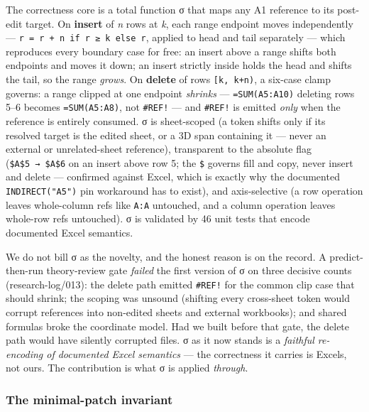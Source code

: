 \documentclass[
]{article}
\begin{document}
The correctness core is a total function σ that maps any A1 reference to
its post-edit target. On \textbf{insert} of \emph{n} rows at \emph{k},
each range endpoint moves independently ---
\texttt{r\textquotesingle{}\ =\ r\ +\ n\ if\ r\ ≥\ k\ else\ r}, applied
to head and tail separately --- which reproduces every boundary case for
free: an insert above a range shifts both endpoints and moves it down;
an insert strictly inside holds the head and shifts the tail, so the
range \emph{grows}. On \textbf{delete} of rows \texttt{{[}k,\ k+n)}, a
six-case clamp governs: a range clipped at one endpoint \emph{shrinks}
--- \texttt{=SUM(A5:A10)} deleting rows 5--6 becomes
\texttt{=SUM(A5:A8)}, not \texttt{\#REF!} --- and \texttt{\#REF!} is
emitted \emph{only} when the reference is entirely consumed. σ is
sheet-scoped (a token shifts only if its resolved target is the edited
sheet, or a 3D span containing it --- never an external or
unrelated-sheet reference), transparent to the absolute flag
(\texttt{\$A\$5\ →\ \$A\$6} on an insert above row 5; the \texttt{\$}
governs fill and copy, never insert and delete --- confirmed against
Excel, which is exactly why the documented \texttt{INDIRECT("A5")} pin
workaround has to exist), and axis-selective (a row operation leaves
whole-column refs like \texttt{A:A} untouched, and a column operation
leaves whole-row refs untouched). σ is validated by 46 unit tests that
encode documented Excel semantics.

We do not bill σ as the novelty, and the honest reason is on the record.
A predict-then-run theory-review gate \emph{failed} the first version of
σ on three decisive counts (research-log/013): the delete path emitted
\texttt{\#REF!} for the common clip case that should shrink; the scoping
was unsound (shifting every cross-sheet token would corrupt references
into non-edited sheets and external workbooks); and shared formulas
broke the coordinate model. Had we built before that gate, the delete
path would have silently corrupted files. σ as it now stands is a
\emph{faithful re-encoding of documented Excel semantics} --- the
correctness it carries is Excel\textquotesingle s, not ours. The
contribution is what σ is applied \emph{through}.

\subsubsection{The minimal-patch
invariant}\label{the-minimal-patch-invariant}
\end{document}
